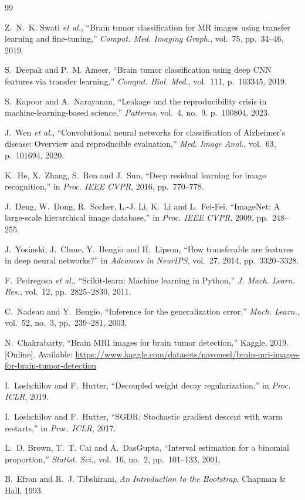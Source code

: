 \documentclass[conference]{IEEEtran}
\begin{document}
\begin{thebibliography}{99}

Z.~N.~K. Swati \emph{et al.}, ``Brain tumor classification for MR images using transfer learning and fine-tuning,'' \emph{Comput. Med. Imaging Graph.}, vol.~75, pp.~34--46, 2019.

S.~Deepak and P.~M. Ameer, ``Brain tumor classification using deep CNN features via transfer learning,'' \emph{Comput. Biol. Med.}, vol.~111, p.~103345, 2019.

S.~Kapoor and A.~Narayanan, ``Leakage and the reproducibility crisis in machine-learning-based science,'' \emph{Patterns}, vol.~4, no.~9, p.~100804, 2023.

J.~Wen \emph{et al.}, ``Convolutional neural networks for classification of Alzheimer's disease: Overview and reproducible evaluation,'' \emph{Med. Image Anal.}, vol.~63, p.~101694, 2020.

K.~He, X.~Zhang, S.~Ren and J.~Sun, ``Deep residual learning for image recognition,'' in \emph{Proc. IEEE CVPR}, 2016, pp.~770--778.

J.~Deng, W.~Dong, R.~Socher, L.-J. Li, K.~Li and L.~Fei-Fei, ``ImageNet: A large-scale hierarchical image database,'' in \emph{Proc. IEEE CVPR}, 2009, pp.~248--255.

J.~Yosinski, J.~Clune, Y.~Bengio and H.~Lipson, ``How transferable are features in deep neural networks?'' in \emph{Advances in NeurIPS}, vol.~27, 2014, pp.~3320--3328.

F.~Pedregosa \emph{et al.}, ``Scikit-learn: Machine learning in Python,'' \emph{J. Mach. Learn. Res.}, vol.~12, pp.~2825--2830, 2011.

C.~Nadeau and Y.~Bengio, ``Inference for the generalization error,'' \emph{Mach. Learn.}, vol.~52, no.~3, pp.~239--281, 2003.

N.~Chakrabarty, ``Brain MRI images for brain tumor detection,'' Kaggle, 2019. [Online]. Available: \url{https://www.kaggle.com/datasets/navoneel/brain-mri-images-for-brain-tumor-detection}

I.~Loshchilov and F.~Hutter, ``Decoupled weight decay regularization,'' in \emph{Proc. ICLR}, 2019.

I.~Loshchilov and F.~Hutter, ``SGDR: Stochastic gradient descent with warm restarts,'' in \emph{Proc. ICLR}, 2017.

L.~D. Brown, T.~T. Cai and A.~DasGupta, ``Interval estimation for a binomial proportion,'' \emph{Statist. Sci.}, vol.~16, no.~2, pp.~101--133, 2001.

B.~Efron and R.~J. Tibshirani, \emph{An Introduction to the Bootstrap}. Chapman \& Hall, 1993.

\end{thebibliography}
\end{document}
